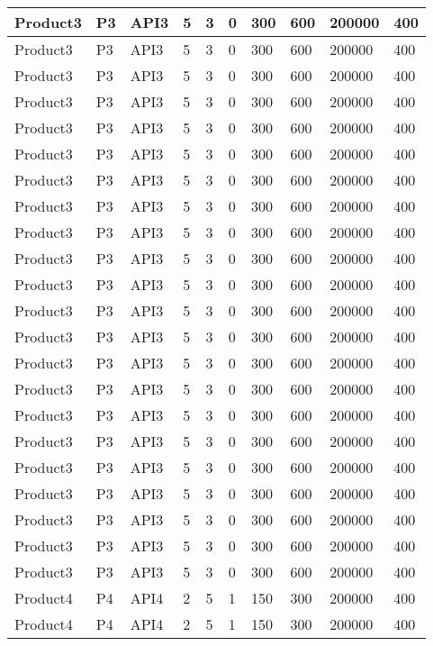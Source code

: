 \documentclass{article}
\begin{document}
\begin{longtable}[l]{|p{1.5cm}|p{1.7cm}|p{1cm}|p{1.5cm}|p{1.7cm}|p{1cm}|p{1cm}|p{1cm}|p{1cm}|p{1.5cm}|}
\hline
Product3 & P3 & API3 & 5 & 3 & 0 & 300 & 600 & 200000 & 400\\
\hline
Product3 & P3 & API3 & 5 & 3 & 0 & 300 & 600 & 200000 & 400\\
\hline
Product3 & P3 & API3 & 5 & 3 & 0 & 300 & 600 & 200000 & 400\\
\hline
Product3 & P3 & API3 & 5 & 3 & 0 & 300 & 600 & 200000 & 400\\
\hline
Product3 & P3 & API3 & 5 & 3 & 0 & 300 & 600 & 200000 & 400\\
\hline
Product3 & P3 & API3 & 5 & 3 & 0 & 300 & 600 & 200000 & 400\\
\hline
Product3 & P3 & API3 & 5 & 3 & 0 & 300 & 600 & 200000 & 400\\
\hline
Product3 & P3 & API3 & 5 & 3 & 0 & 300 & 600 & 200000 & 400\\
\hline
Product3 & P3 & API3 & 5 & 3 & 0 & 300 & 600 & 200000 & 400\\
\hline
Product3 & P3 & API3 & 5 & 3 & 0 & 300 & 600 & 200000 & 400\\
\hline
Product3 & P3 & API3 & 5 & 3 & 0 & 300 & 600 & 200000 & 400\\
\hline
Product3 & P3 & API3 & 5 & 3 & 0 & 300 & 600 & 200000 & 400\\
\hline
Product3 & P3 & API3 & 5 & 3 & 0 & 300 & 600 & 200000 & 400\\
\hline
Product3 & P3 & API3 & 5 & 3 & 0 & 300 & 600 & 200000 & 400\\
\hline
Product3 & P3 & API3 & 5 & 3 & 0 & 300 & 600 & 200000 & 400\\
\hline
Product3 & P3 & API3 & 5 & 3 & 0 & 300 & 600 & 200000 & 400\\
\hline
Product3 & P3 & API3 & 5 & 3 & 0 & 300 & 600 & 200000 & 400\\
\hline
Product3 & P3 & API3 & 5 & 3 & 0 & 300 & 600 & 200000 & 400\\
\hline
Product3 & P3 & API3 & 5 & 3 & 0 & 300 & 600 & 200000 & 400\\
\hline
Product3 & P3 & API3 & 5 & 3 & 0 & 300 & 600 & 200000 & 400\\
\hline
Product3 & P3 & API3 & 5 & 3 & 0 & 300 & 600 & 200000 & 400\\
\hline
Product3 & P3 & API3 & 5 & 3 & 0 & 300 & 600 & 200000 & 400\\
\hline
Product4 & P4 & API4 & 2 & 5 & 1 & 150 & 300 & 200000 & 400\\
\hline
Product4 & P4 & API4 & 2 & 5 & 1 & 150 & 300 & 200000 & 400\\

\end{longtable}
\end{document}
